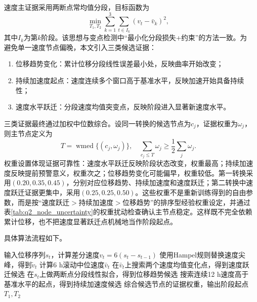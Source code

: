 速度主证据采用两断点常均值分段，目标函数为
\begin{equation}
  \min_{T_1,T_2}\sum_{k=1}^{3}\sum_{t\in I_k}(v_t-\bar v_k)^2 ,
\end{equation}
其中$I_k$为第$k$阶段。该思想与变点检测中“最小化分段损失+约束”的方法一致\citep{killick2012optimal}。为避免单一速度节点偏晚，本文引入三类候选证据：

\begin{enumerate}
  \item 位移趋势变化：累计位移分段线性误差最小处，反映曲率开始改变；
  \item 持续加速度起点：速度连续多个窗口高于基准水平，反映加速开始具备持续性；
  \item 速度水平跃迁：分段速度均值突变点，反映阶段进入显著新速度水平。
\end{enumerate}

三类证据最终通过加权中位数综合。设同一转换的候选节点为$c_j$，证据权重为$\omega_j$，则主节点定义为
\begin{equation}
  T=\operatorname*{wmed}\{(c_j,\omega_j)\},\quad
  \sum_{c_j\leq T}\omega_j\geq\frac{1}{2}\sum_j\omega_j .
\end{equation}
权重设置体现证据可靠性：速度水平跃迁反映阶段状态改变，权重最高；持续加速度反映提前预警意义，权重次之；位移趋势变化可能偏早，权重较低。第一转换采用$(0.20,0.35,0.45)$，分别对应位移趋势、持续加速度和速度跃迁；第二转换中速度跃迁证据更集中，采用$(0.25,0.25,0.50)$。这些权重不是重新训练得到的自由参数，而是按“速度跃迁$>$持续加速度$>$位移趋势”的排序型经验权重设定，并通过表\ref{tab:q2_node_uncertainty}的权重扰动检查确认主节点稳定。这样既不完全依赖累计位移，也不把速度显著跃迁点机械地当作阶段起点。


具体算法流程如下。

\begin{algorithm}[H]
\caption{问题二复合证据阶段识别}
\begin{algorithmic}[1]
\State 输入位移序列$s_t$，计算差分速度$v_t=6(s_t-s_{t-1})$
\State 使用Hampel规则替换速度尖峰，得到$\tilde v_t$
\State 计算6 h滚动中位速度$\bar v_t$
\State 在$\bar v_t$上搜索两个速度均值变化点，得到速度跃迁候选
\State 在$s_t$上做两断点分段线性拟合，得到位移趋势候选
\State 搜索连续12 h速度高于基准水平的起点，得到持续加速度候选
\State 综合候选节点的证据权重，输出阶段起点$T_1,T_2$
\end{algorithmic}
\end{algorithm}

